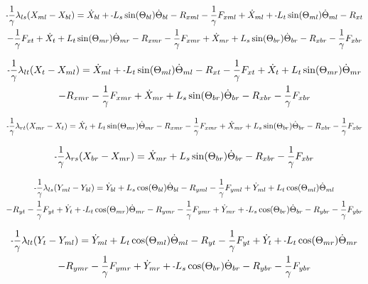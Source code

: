 \documentclass[11pt, landscape]{article}
\newcommand{\mn}{\scalebox{0.7}[1.0]{-}}
\begin{document}
\begin{multline}
\mn\frac{1}{\gamma}\lambda_{ls}(X_{ml} - X_{bl}) =
\dot{X}_{bl} + \mn L_{s}\sin(\Theta_{bl})\dot{\Theta}_{bl} - R_{xml} - \frac{1}{\gamma}F_{xml} + \dot{X}_{ml} + \mn L_{t}\sin(\Theta_{ml})\dot{\Theta}_{ml} - R_{xt } \\
- \frac{1}{\gamma}F_{xt } + \dot{X}_{t } + L_{t}\sin(\Theta_{mr})\dot{\Theta}_{mr} - R_{xmr}
-\frac{1}{\gamma}F_{xmr} + \dot{X}_{mr} + L_{s}\sin(\Theta_{br})\dot{\Theta}_{br} - R_{xbr} - \frac{1}{\gamma}F_{xbr}
\label{eq:Ax}
\end{multline}%

\begin{multline}
\mn\frac{1}{\gamma}\lambda_{lt}(X_{t } - X_{ml}) =
\dot{X}_{ml} + \mn L_{t}\sin(\Theta_{ml})\dot{\Theta}_{ml} - R_{xt } - \frac{1}{\gamma}F_{xt } + \dot{X}_{t } + L_{t}\sin(\Theta_{mr})\dot{\Theta}_{mr} \\
- R_{xmr} - \frac{1}{\gamma}F_{xmr} + \dot{X}_{mr} + L_{s}\sin(\Theta_{br})\dot{\Theta}_{br} - R_{xbr} - \frac{1}{\gamma}F_{xbr}
\label{eq:Bx}
\end{multline}%

\begin{equation}
\mn\frac{1}{\gamma}\lambda_{rt}(X_{mr} - X_{t }) =
\dot{X}_{t } + L_{t}\sin(\Theta_{mr})\dot{\Theta}_{mr} - R_{xmr} - \frac{1}{\gamma}F_{xmr}
+ \dot{X}_{mr} + L_{s}\sin(\Theta_{br})\dot{\Theta}_{br} - R_{xbr} - \frac{1}{\gamma}F_{xbr}
\label{eq:Cx}
\end{equation}%

\begin{equation}
\mn\frac{1}{\gamma}\lambda_{rs}(X_{br} - X_{mr}) = 
\dot{X}_{mr} + L_{s}\sin(\Theta_{br})\dot{\Theta}_{br} - R_{xbr} - \frac{1}{\gamma}F_{xbr}
\label{eq:Dx}
\end{equation}%


\begin{multline}
\mn\frac{1}{\gamma}\lambda_{ls}(Y_{ml} - Y_{bl}) =
\dot{Y}_{bl} + L_{s}\cos(\Theta_{bl})\dot{\Theta}_{bl} - R_{yml} - \frac{1}{\gamma}F_{yml} + \dot{Y}_{ml} + L_{t}\cos(\Theta_{ml})\dot{\Theta}_{ml} \\
- R_{yt} - \frac{1}{\gamma}F_{yt } + \dot{Y}_{t } + \mn L_{t}\cos(\Theta_{mr})\dot{\Theta}_{mr} - R_{ymr} - \frac{1}{\gamma}F_{ymr} + \dot{Y}_{mr}
+ \mn L_{s}\cos(\Theta_{br})\dot{\Theta}_{br} - R_{ybr} - \frac{1}{\gamma}F_{ybr}
\label{eq:Ay}
\end{multline}%

\begin{multline}
\mn\frac{1}{\gamma}\lambda_{lt}(Y_{t } - Y_{ml}) =
\dot{Y}_{ml} + L_{t}\cos(\Theta_{ml})\dot{\Theta}_{ml} - R_{yt} - \frac{1}{\gamma}F_{yt } + \dot{Y}_{t } + \mn L_{t}\cos(\Theta_{mr})\dot{\Theta}_{mr} \\
- R_{ymr} - \frac{1}{\gamma}F_{ymr} + \dot{Y}_{mr} + \mn L_{s}\cos(\Theta_{br})\dot{\Theta}_{br} - R_{ybr} - \frac{1}{\gamma}F_{ybr}
\label{eq:By}
\end{multline}%
\end{document}

